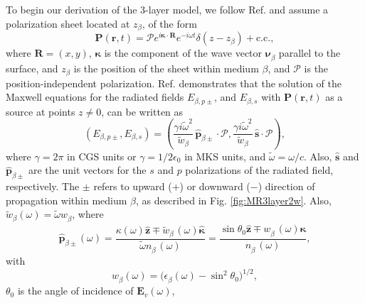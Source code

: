 \documentclass[aps,pra,10pt,amsmath,notitlepage,letterpaper]{revtex4-1}
\begin{document}
To begin our derivation of the 3-layer model, we follow Ref.
\cite{mizrahiJOSA88} and assume a polarization sheet located at $z_{\beta}$, of
the form
\begin{equation}\label{eq:psheet}
\mathbf{P}(\mathbf{r},t) = \boldsymbol{\mathcal{P}}
e^{i\boldsymbol{\kappa}\cdot\mathbf{R}}e^{-i\omega t}\delta(z - z_{\beta}) 
+ \mathrm{c.c.},
\end{equation}
where $\mathbf{R}=(x,y)$, $\boldsymbol{\kappa}$ is the component of the wave
vector $\boldsymbol{\nu}^{\phantom{a}}_{\beta}$ parallel to the surface, and
$z_{\beta}$ is the position of the sheet within medium $\beta$, and
$\boldsymbol{\mathcal{P}}$ is the position-independent polarization. Ref.
\cite{sipeJOSAB87} demonstrates that the solution of the Maxwell equations for
the radiated fields $E_{\beta,p\pm}$, and $E_{\beta,s}$ with
$\mathbf{P}(\mathbf{r},t)$ as a source at points $z\neq 0$, can be written as
\begin{equation}\label{eq:solmaxwell}
(E_{\beta,p\pm},E_{\beta,s}) = 
(\frac{\gamma i\tilde{\omega}^2}{\tilde{w}_{\beta}}
\,\hat{\mathbf{p}}_{\beta\pm}\cdot\boldsymbol{\mathcal{P}},
\frac{\gamma i\tilde{\omega}^2}{\tilde{w}_{\beta}}
\,\hat{\mathbf{s}}\cdot\boldsymbol{\mathcal{P}}),
\end{equation} 
where $\gamma=2\pi$ in CGS units or $\gamma=1/2\epsilon_{0}$ in MKS units, and
$\tilde{\omega}=\omega/c$. Also, $\hat{\mathbf{s}}$ and
$\hat{\mathbf{p}}_{\beta\pm}$ are the unit vectors for the $s$ and $p$
polarizations of the radiated field, respectively. The $\pm$ refers to upward
($+$) or downward ($-$) direction of propagation within medium $\beta$, as
described in Fig. \ref{fig:MR3layer2w}. Also,
$\tilde{w}^{\phantom{a}}_{\beta}(\omega)=\tilde{\omega}w^{\phantom{a}}_{\beta}$,
where
\begin{equation}\label{eq:r4}
\hat{\mathbf{p}}^{\phantom{A}}_{\beta\pm}(\omega) =
  \frac{\kappa(\omega)\hat{\mathbf{z}}\mp 
  \tilde{w}^{\phantom{A}}_{\beta}(\omega)\hat{\boldsymbol{\kappa}}} 
  {\tilde{\omega} n^{\phantom{A}}_{\beta}(\omega)}
= \frac{\sin\theta_{0}\hat{\mathbf{z}}\mp 
  w^{\phantom{A}}_{\beta}(\omega)\hat{\boldsymbol{\kappa}}} 
  {n^{\phantom{A}}_{\beta}(\omega)},
\end{equation}
with
\begin{equation}\label{eq:wavevector}
w^{\phantom{a}}_{\beta}(\omega) = 
\big(\epsilon^{\phantom{a}}_{\beta}(\omega) - \sin^{2}\theta_{0}\big)^{1/2},
\end{equation}
$\theta_{0}$ is the angle of incidence of $\mathbf{E}_{v}(\omega)$,
\end{document}
